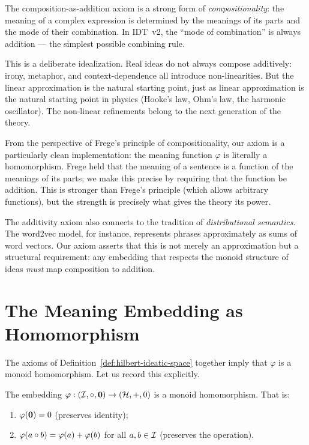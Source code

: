 \begin{interpretation}
\label{interp:additivity}
The composition-as-addition axiom is a strong form of \emph{compositionality}:
the meaning of a complex expression is determined by the meanings of its parts
and the mode of their combination. In IDT~v2, the ``mode of combination'' is
always addition --- the simplest possible combining rule.

This is a deliberate idealization. Real ideas do not always compose additively:
irony, metaphor, and context-dependence all introduce non-linearities. But the
linear approximation is the natural starting point, just as linear approximation
is the natural starting point in physics (Hooke's law, Ohm's law, the harmonic
oscillator). The non-linear refinements belong to the next generation of the
theory.

From the perspective of Frege's principle of compositionality, our axiom is a
particularly clean implementation: the meaning function $\varphi$ is literally
a homomorphism. Frege held that the meaning of a sentence is a function of the
meanings of its parts; we make this precise by requiring that the function be
addition. This is stronger than Frege's principle (which allows arbitrary
functions), but the strength is precisely what gives the theory its power.

The additivity axiom also connects to the tradition of \emph{distributional
semantics}. The word2vec model, for instance, represents phrases approximately
as sums of word vectors. Our axiom asserts that this is not merely an
approximation but a structural requirement: any embedding that respects the
monoid structure of ideas \emph{must} map composition to addition.
\end{interpretation}


\section{The Meaning Embedding as Homomorphism}

The axioms of Definition~\ref{def:hilbert-ideatic-space} together imply that
$\varphi$ is a monoid homomorphism. Let us record this explicitly.

\begin{proposition}
\label{prop:phi-homomorphism}
The embedding $\varphi : (\mathcal{I}, \circ, \mathbf{0}) \to (\mathcal{H}, +, 0)$ is a
monoid homomorphism. That is:
\begin{enumerate}
\item $\varphi(\mathbf{0}) = 0$ (preserves identity);
\item $\varphi(a \circ b) = \varphi(a) + \varphi(b)$ for all $a, b \in \mathcal{I}$
(preserves the operation).
\end{enumerate}
\end{proposition}


